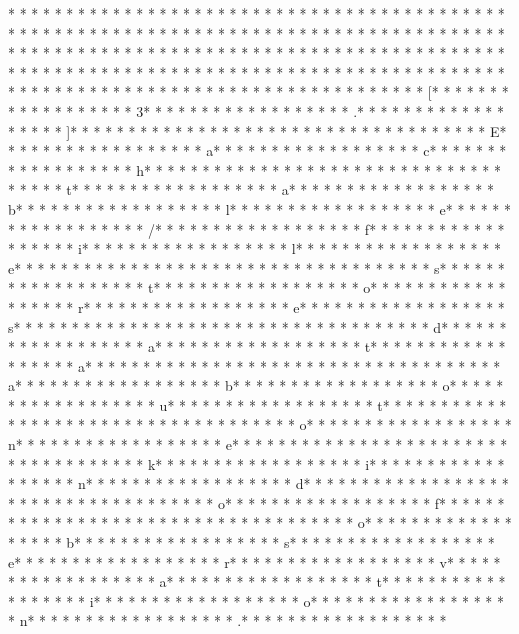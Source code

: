 * * *  * * *  * * *  *  * * *  *  * * *  * 	* * *  * * *  * * *  *  * * *  *  * * *  * 	* * *  * * *  * * *  *  * * *  *  * * *  * 	* * *  * * *  * * *  *  * * *  *  * * *  * * *  * * *  *  * * *  *  * * *  * * *  * * *  *  * * *  *  * * *  *  * * *  * * *  * * *  *  * * *  *  * * *  *  * * *  * * *  * * *  *  * * *  *  * * *  *  * * *  * * *  * * *  *  * * *  *  * * *  *  * * *  * * *  * * *  *  * * *  *  * * *  *  * * *  * * *  * * *  *  * * *  *  * * *  *  * * *  * * *  * * *  *  * * *  *  * * *  * [* * *  * * *  * * *  *  * * *  *  * * *  * 3* * *  * * *  * * *  *  * * *  *  * * *  * .* * *  * * *  * * *  *  * * *  *  * * *  * ]* * *  * * *  * * *  *  * * *  *  * * *  *  * * *  * * *  * * *  *  * * *  *  * * *  * E* * *  * * *  * * *  *  * * *  *  * * *  * a* * *  * * *  * * *  *  * * *  *  * * *  * c* * *  * * *  * * *  *  * * *  *  * * *  * h* * *  * * *  * * *  *  * * *  *  * * *  *  * * *  * * *  * * *  *  * * *  *  * * *  * t* * *  * * *  * * *  *  * * *  *  * * *  * a* * *  * * *  * * *  *  * * *  *  * * *  * b* * *  * * *  * * *  *  * * *  *  * * *  * l* * *  * * *  * * *  *  * * *  *  * * *  * e* * *  * * *  * * *  *  * * *  *  * * *  * /* * *  * * *  * * *  *  * * *  *  * * *  * f* * *  * * *  * * *  *  * * *  *  * * *  * i* * *  * * *  * * *  *  * * *  *  * * *  * l* * *  * * *  * * *  *  * * *  *  * * *  * e* * *  * * *  * * *  *  * * *  *  * * *  *  * * *  * * *  * * *  *  * * *  *  * * *  * s* * *  * * *  * * *  *  * * *  *  * * *  * t* * *  * * *  * * *  *  * * *  *  * * *  * o* * *  * * *  * * *  *  * * *  *  * * *  * r* * *  * * *  * * *  *  * * *  *  * * *  * e* * *  * * *  * * *  *  * * *  *  * * *  * s* * *  * * *  * * *  *  * * *  *  * * *  *  * * *  * * *  * * *  *  * * *  *  * * *  * d* * *  * * *  * * *  *  * * *  *  * * *  * a* * *  * * *  * * *  *  * * *  *  * * *  * t* * *  * * *  * * *  *  * * *  *  * * *  * a* * *  * * *  * * *  *  * * *  *  * * *  *  * * *  * * *  * * *  *  * * *  *  * * *  * a* * *  * * *  * * *  *  * * *  *  * * *  * b* * *  * * *  * * *  *  * * *  *  * * *  * o* * *  * * *  * * *  *  * * *  *  * * *  * u* * *  * * *  * * *  *  * * *  *  * * *  * t* * *  * * *  * * *  *  * * *  *  * * *  *  * * *  * * *  * * *  *  * * *  *  * * *  * o* * *  * * *  * * *  *  * * *  *  * * *  * n* * *  * * *  * * *  *  * * *  *  * * *  * e* * *  * * *  * * *  *  * * *  *  * * *  *  * * *  * * *  * * *  *  * * *  *  * * *  * k* * *  * * *  * * *  *  * * *  *  * * *  * i* * *  * * *  * * *  *  * * *  *  * * *  * n* * *  * * *  * * *  *  * * *  *  * * *  * d* * *  * * *  * * *  *  * * *  *  * * *  *  * * *  * * *  * * *  *  * * *  *  * * *  * o* * *  * * *  * * *  *  * * *  *  * * *  * f* * *  * * *  * * *  *  * * *  *  * * *  *  * * *  * * *  * * *  *  * * *  *  * * *  * o* * *  * * *  * * *  *  * * *  *  * * *  * b* * *  * * *  * * *  *  * * *  *  * * *  * s* * *  * * *  * * *  *  * * *  *  * * *  * e* * *  * * *  * * *  *  * * *  *  * * *  * r* * *  * * *  * * *  *  * * *  *  * * *  * v* * *  * * *  * * *  *  * * *  *  * * *  * a* * *  * * *  * * *  *  * * *  *  * * *  * t* * *  * * *  * * *  *  * * *  *  * * *  * i* * *  * * *  * * *  *  * * *  *  * * *  * o* * *  * * *  * * *  *  * * *  *  * * *  * n* * *  * * *  * * *  *  * * *  *  * * *  * .* * *  * * *  * * *  *  * * *  *  * * *  * 
